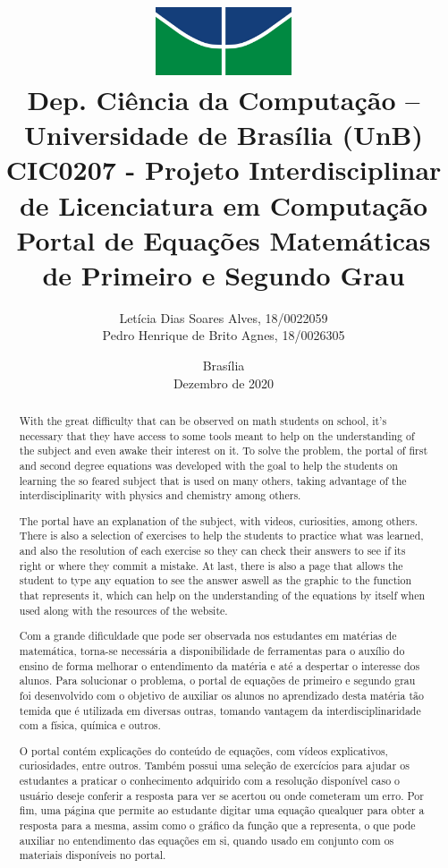 \documentclass[12pt]{report}
\title{
        \includegraphics[width=4cm]{img/logo.jpg} \\ 
        \large
        Dep. Ciência da Computação -- Universidade de Brasília (UnB)\\
        CIC0207 - Projeto Interdisciplinar de Licenciatura em Computação \\
        \vfill 
        \vfill
        \LARGE
        \textbf{Portal de Equações Matemáticas de Primeiro e Segundo Grau}
    }
\author{
        Letícia Dias Soares Alves, 18/0022059\\
        Pedro Henrique de Brito Agnes, 18/0026305
    }
\affil{
        \vfill
        \vfill
        \vfill
        Professora \\
        Dr.a Letícia Lopes Leite
    }
\date{Brasília\\Dezembro de 2020}
\begin{document}
\maketitle

\begin{abstract}
  With the great difficulty that can be observed on math students on school, it's necessary that they have access to some tools meant to help on the understanding of the subject and even awake their interest on it. To solve the problem, the portal of first and second degree equations was developed with the goal to help the students on learning the so feared subject that is used on many others, taking advantage of the interdisciplinarity with physics and chemistry among others.

  The portal have an explanation of the subject, with videos, curiosities, among others. There is also a selection of exercises to help the students to practice what was learned, and also the resolution of each exercise so they can check their answers to see if its right or where they commit a mistake. At last, there is also a page that allows the student to type any equation to see the answer aswell as the graphic to the function that represents it, which can help on the understanding of the equations by itself when used along with the resources of the website.
\end{abstract}

\begin{abstract}
  Com a grande dificuldade que pode ser observada nos estudantes em matérias de matemática, torna-se necessária a disponibilidade de ferramentas para o auxílio do ensino de forma melhorar o entendimento da matéria e até a despertar o interesse dos alunos. Para solucionar o problema, o portal de equações de primeiro e segundo grau foi desenvolvido com o objetivo de auxiliar os alunos no aprendizado desta matéria tão temida que é utilizada em diversas outras, tomando vantagem da interdisciplinaridade com a física, química e outros.

  O portal contém explicações do conteúdo de equações, com vídeos explicativos, curiosidades, entre outros. Também possui uma seleção de exercícios para ajudar os estudantes a praticar o conhecimento adquirido com a resolução disponível caso o usuário deseje conferir a resposta para ver se acertou ou onde cometeram um erro. Por fim, uma página que permite ao estudante digitar uma equação quealquer para obter a resposta para a mesma, assim como o gráfico da função que a representa, o que pode auxiliar no entendimento das equações em si, quando usado em conjunto com os materiais disponíveis no portal.
\end{abstract}
\end{document}
